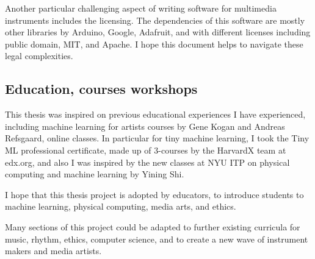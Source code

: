 Another particular challenging aspect of writing software for multimedia instruments includes the licensing. The dependencies of this software are mostly other libraries by Arduino, Google, Adafruit, and with different licenses including public domain, MIT, and Apache. I hope this document helps to navigate these legal complexities.

\subsection{Education, courses workshops}

This thesis was inspired on previous educational experiences I have experienced, including machine learning for artists courses by Gene Kogan and Andreas Refsgaard, online classes. In particular for tiny machine learning, I took the Tiny ML professional certificate, made up of 3-courses by the HarvardX team at edx.org, and also I was inspired by the new classes at NYU ITP on physical computing and machine learning by Yining Shi.

I hope that this thesis project is adopted by educators, to introduce students to machine learning, physical computing, media arts, and ethics.

Many sections of this project could be adapted to further existing curricula for music, rhythm, ethics, computer science, and to create a new wave of instrument makers and media artists.
